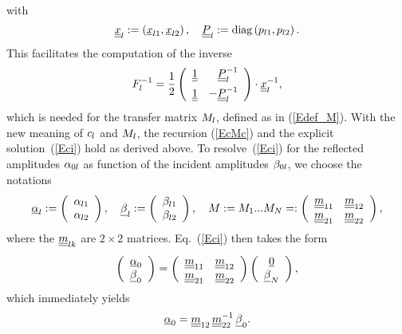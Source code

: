 with
\begin{equation}
  \underline{\underline{x}}_l :=
  \left(\underline{x}_{l1}, \underline{x}_{l2}\right),
  \quad
  \underline{\underline{P}}_l :=
  \text{diag}\left(p_{l1},p_{l2}\right).
\end{equation}
This facilitates the computation of the inverse
\begin{equation}
  F_l^{-1}
    = \frac{1}{2}
    \left(\begin{array}{cc}\underline{\underline{1}}&\hphantom{-}\underline{\underline{P}}_l^{-1}\\[1.2ex]
      \underline{\underline{1}} &-\underline{\underline{P}}_l^{-1}\end{array}\right)
      \cdot\underline{\underline{x}}_l^{-1},
\end{equation}
which is needed for the transfer matrix $M_l$,
defined as in (\ref{Edef_M}).
With the new meaning of $c_l$ and $M_l$,
the recursion (\ref{EcMc}) and the explicit solution~(\ref{Eci})
hold as derived above.
To resolve~(\ref{Eci}) for the reflected amplitudes $\alpha_{0l}$
as function of the incident amplitudes $\beta_{0l}$,
we choose the notations
\begin{equation}
  \u\alpha_\il
  :=\left(\begin{array}{c}\alpha_{\il1}\\\alpha_{\il2}\end{array}\right),\quad
  \u\beta_\il
  :=\left(\begin{array}{c}\beta_{\il1}\\\beta_{\il2}\end{array}\right),\quad
  M:=M_1 ... M_N %
  =:\left(\begin{array}{cc}\uu m_{11}&\uu m_{12}\\
                           \uu m_{21}&\uu m_{22}\end{array}\right),
\end{equation}
where the $\underline{\underline{m}}_{l k}$ are $2\times2$ matrices.
Eq.~(\ref{Eci}) then takes the form
\begin{equation}
  \left(\begin{array}{c}\underline{\alpha}_{0}\\\underline{\beta}_{0}\end{array}\right)
  = 
  \left(\begin{array}{cc}\underline{\underline{m}}_{11}&\underline{\underline{m}}_{12}\\
    \underline{\underline{m}}_{21}&\underline{\underline{m}}_{22}\end{array}\right)
  \left(\begin{array}{c}\underline{0}\\\underline{\beta}_{N}\end{array}\right),
\end{equation}
which immediately yields
\begin{equation}
  \underline{\alpha}_0 = \underline{\underline{m}}_{12}\,\underline{\underline{m}}_{22}^{-1}\,\underline{\beta}_0.
\end{equation}

%
